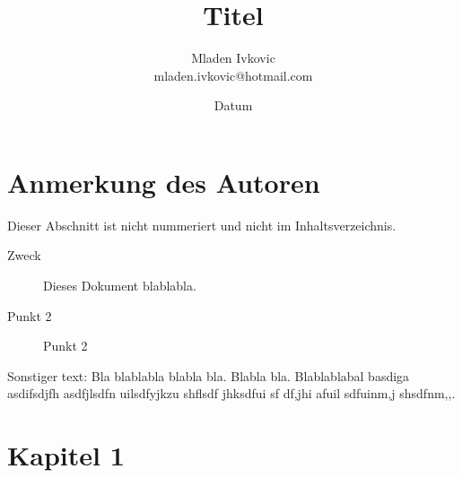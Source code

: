 \documentclass[12pt, a4paper, twopage]{scrartcl}
\title{Titel}
\author{Mladen Ivkovic\\
mladen.ivkovic@hotmail.com\\
}
\date{Datum}
\begin{document}
		
		
\nocite{*} %
		
		






\maketitle
\clearpage

\tableofcontents %
\clearpage







\section*{Anmerkung des Autoren}

Dieser Abschnitt ist nicht nummeriert und nicht im Inhaltsverzeichnis. 


\begin{description}
  \item[Zweck] Dieses Dokument blablabla.
  \item[Punkt 2] Punkt 2
\end{description}

Sonstiger text: Bla blablabla blabla bla. Blabla bla. Blablablabal basdiga asdifsdjfh asdfjlsdfn uilsdfyjkzu shflsdf jhksdfui sf df,jhi afuil sdfuinm,j shsdfnm,,.
\clearpage





















\section{Kapitel 1}
\end{document}
